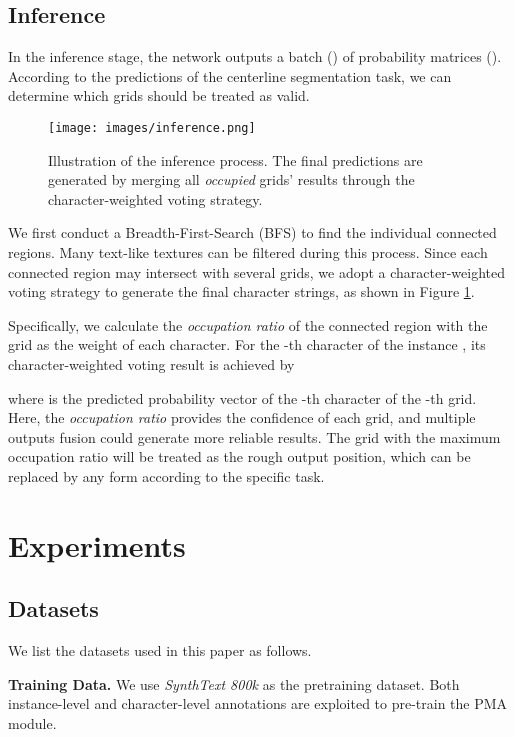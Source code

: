 \documentclass[letterpaper]{article} \usepackage{aaai21}  \usepackage{times}  \usepackage{helvet} \usepackage{courier}  \usepackage[hyphens]{url}  \usepackage{graphicx} \urlstyle{rm} \def\UrlFont{\rm}  \usepackage{natbib}  \usepackage{caption} \frenchspacing  \setlength{\pdfpagewidth}{8.5in}  \setlength{\pdfpageheight}{11in}  \usepackage{multirow}
\begin{document}
\subsection{Inference}
In the inference stage, the network outputs a batch () of probability matrices (). According to the predictions of the centerline segmentation task, we can determine which grids should be treated as valid.
\begin{figure}
\begin{center}
\texttt{[image: images/inference.png]}\\
\end{center}
\caption{
Illustration of the inference process. The final predictions are generated by merging all \emph{occupied} grids' results through the character-weighted voting strategy.
}
\label{fig:inference}
\end{figure}
We first conduct a Breadth-First-Search (BFS) to find the individual connected regions.
Many text-like textures can be filtered during this process.
Since each connected region may intersect with several grids, we adopt a character-weighted voting strategy to generate the final character strings, as shown in Figure \ref{fig:inference}.

Specifically, we calculate the \emph{occupation ratio}  of the connected region  with the grid  as the weight of each character.
For the -th character of the instance , its character-weighted voting result is achieved by

where  is the predicted probability vector of the -th character of the -th grid.
Here, the \emph{occupation ratio} provides the confidence of each grid, and multiple outputs fusion could generate more reliable results. The grid with the maximum occupation ratio will be treated as the rough output position, which can be replaced by any form according to the specific task.

\section{Experiments}
\subsection{Datasets}
We list the datasets used in this paper as follows.

\textbf{Training Data.}
We use \emph{SynthText 800k} \cite{gupta2016synthetic} as the pretraining dataset. Both instance-level and character-level annotations are exploited to pre-train the PMA module.
\end{document}
